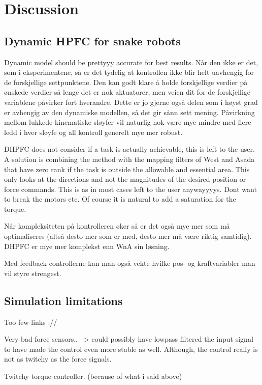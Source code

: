 \chapter{Discussion}\label{ch:discussion}


\section{Dynamic HPFC for snake robots}

Dynamic model should be prettyyy accurate for best results. Når den ikke er det, som i eksperimentene, så er det tydelig at kontrollen ikke blir helt uavhengig for de forskjellige settpunktene. Den kan godt klare å holde forskjellige verdier på ønskede verdier så lenge det er nok aktuatorer, men veien dit for de forskjellige variablene påvirker fort hverandre. Dette er jo gjerne også delen som i høyst grad er avhengig av den dynamiske modellen, så det gir sånn sett mening. Påvirkning mellom lukkede kinematiske sløyfer vil naturlig nok være mye mindre med flere ledd i hver sløyfe og all kontroll generelt mye mer robust.

DHPFC does not consider if a task is actually achievable, this is left to the user. A solution is combining the method with the mapping filters of West and Asada that have zero rank if the task is outside the allowable and essential area. This only looks at the directions and not the magnitudes of the desired position or force commands. This is as in most cases left to the user anywayyyys. Dont want to break the motors etc. Of course it is natural to add a saturation for the torque.

Når kompleksiteten på kontrolleren øker så er det også mye mer som må optimaliseres (altså desto mer som er med, desto mer må være riktig samtidig). DHPFC er mye mer komplekst enn WnA sin løsning.

Med feedback controllerne kan man også vekte hvilke pos- og kraftvariabler man vil styre strengest.

\section{Simulation limitations}

Too few links ://

Very bad force sensors.. --> could possibly have lowpass filtered the input signal to have made the control even more stable as well. Although, the control really is not as twitchy as the force signals.

Twitchy torque controller. (because of what i said above)

